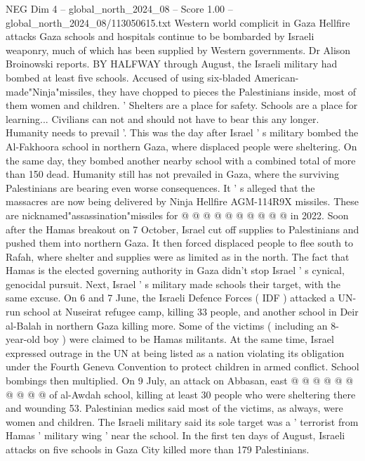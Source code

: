 \begin{textsample}{NEG Dim 4 – global\_north\_2024\_08 – Score 1.00 – global\_north\_2024\_08/113050615.txt}  \label{ex:f4_neg_300}
Western world complicit in Gaza Hellfire attacks Gaza schools and hospitals continue to be bombarded by Israeli weaponry, much of which has been supplied by Western governments.
Dr Alison Broinowski reports.
BY HALFWAY through August, the Israeli military had bombed at least five schools.
Accused of using six-bladed American-made"Ninja"missiles, they have chopped to pieces the Palestinians inside, most of them women and children. ' Shelters are a place for safety.
Schools are a place for learning...
Civilians can not and should not have to bear this any longer.
Humanity needs to prevail '.
This was the day after Israel ' s military bombed the Al-Fakhoora school in northern Gaza, where displaced people were sheltering.
On the same day, they bombed another nearby school with a combined total of more than 150 dead.
Humanity still has not prevailed in Gaza, where the surviving Palestinians are bearing even worse consequences.
It ' s alleged that the massacres are now being delivered by Ninja Hellfire AGM-114R9X missiles.
These are nicknamed"assassination"missiles for @ @ @ @ @ @ @ @ @ @ in 2022.
Soon after the Hamas breakout on 7 October, Israel cut off supplies to Palestinians and pushed them into northern Gaza.
It then forced displaced people to flee south to Rafah, where shelter and supplies were as limited as in the north.
The fact that Hamas is the elected governing authority in Gaza didn't stop Israel ' s cynical, genocidal pursuit.
Next, Israel ' s military made schools their target, with the same excuse.
On 6 and 7 June, the Israeli Defence Forces ( IDF ) attacked a UN-run school at Nuseirat refugee camp, killing 33 people, and another school in Deir al-Balah in northern Gaza killing more.
Some of the victims ( including an 8-year-old boy ) were claimed to be Hamas militants.
At the same time, Israel expressed outrage in the UN at being listed as a nation violating its obligation under the Fourth Geneva Convention to protect children in armed conflict.
School bombings then multiplied.
On 9 July, an attack on Abbasan, east @ @ @ @ @ @ @ @ @ @ of al-Awdah school, killing at least 30 people who were sheltering there and wounding 53.
Palestinian medics said most of the victims, as always, were women and children.
The Israeli military said its sole target was a ' terrorist from Hamas ' military wing ' near the school.
In the first ten days of August, Israeli attacks on five schools in Gaza City killed more than 179 Palestinians.

\end{textsample}
